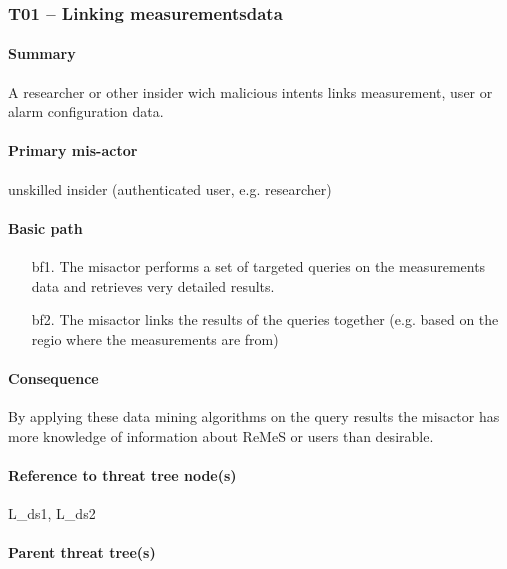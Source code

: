 \subsubsection{T01 -- Linking measurementsdata}
\label{threats:t01}

\paragraph{Summary}

\npar A researcher or other insider wich malicious intents links measurement,
user or alarm configuration data.

\paragraph{Primary mis-actor}

\npar unskilled insider (authenticated user, e.g. researcher)

\paragraph{Basic path}
\begin{enumerate}
	\item[bf1.] The misactor performs a set of targeted queries on the
	measurements data and retrieves very detailed results.
    \item[bf2.] The misactor links the results of the queries together (e.g.
    based on the regio where the measurements are from)
\end{enumerate}

\paragraph{Consequence}

\npar By applying these data mining algorithms on the query results the misactor
has more knowledge of information about ReMeS or users than desirable. 

\paragraph{Reference to threat tree node(s)} 

L\_ds1, L\_ds2


\paragraph{Parent threat tree(s)}

